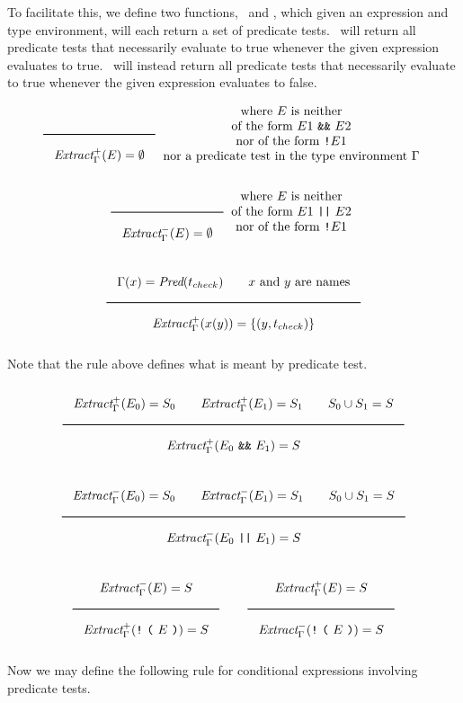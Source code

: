 To facilitate this, we define two functions,
\ExtractPos\ and \ExtractNeg,
which given an expression and type environment,
will each return a set of predicate tests.
\ExtractPos\ will return all predicate tests that necessarily evaluate to true
whenever the given expression evaluates to true.
\ExtractNeg\ will instead return all predicate tests that necessarily evaluate to true
whenever the given expression evaluates to false.

\[
\Rule
{}
{\ExtractPos_\Gamma(E) = \emptyset}
\begin{array}{c}
\text{where $E$ is neither} \\
\text{of the form $E1$ \AndOp\ $E2$} \\
\text{nor of the form \texttt{!}$E1$} \\
\text{nor a predicate test in the type environment $\Gamma$}
\end{array}
\]

\[
\Rule
{}
{\ExtractNeg_\Gamma(E) = \emptyset}
\begin{array}{c}
\text{where $E$ is neither} \\
\text{of the form $E1$ \OrOp\ $E2$} \\
\text{nor of the form \texttt{!}$E1$} \\
\end{array}
\]

\[
\Rule
{\Gamma(x) = \Pred(t_{check}) \qquad x \text{ and } y \text{ are names}}
{\ExtractPos_\Gamma(x(y)) = \{(y, t_{check})\}}
\]

Note that the rule above defines what is meant by predicate test.

\[
\Rule
{\ExtractPos_\Gamma(E_0) = S_0 \qquad \ExtractPos_\Gamma(E_1) = S_1 \qquad S_0 \cup S_1 = S}
{\ExtractPos_\Gamma(E_0\ \AndOp\ E_1) = S}
\]

\[
\Rule
{\ExtractNeg_\Gamma(E_0) = S_0 \qquad \ExtractNeg_\Gamma(E_1) = S_1 \qquad S_0 \cup S_1 = S}
{\ExtractNeg_\Gamma(E_0\ \OrOp\ E_1) = S}
\]

\[
\Rule
{\ExtractNeg_\Gamma(E) = S}
{\ExtractPos_\Gamma(\texttt{!}\ \texttt{(}\ E\ \texttt{)}) = S}
\qquad
\Rule
{\ExtractPos_\Gamma(E) = S}
{\ExtractNeg_\Gamma(\texttt{!}\ \texttt{(}\ E\ \texttt{)}) = S}
\]

Now we may define the following rule for conditional expressions involving predicate tests.

